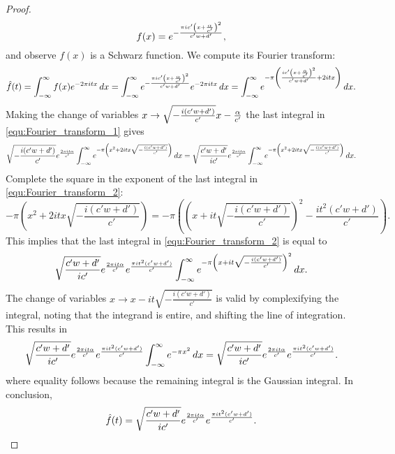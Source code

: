 \documentclass[12pt,reqno,oneside]{amsart}
\begin{document}
\begin{proof}
        \[
            f(x) = e^{-\frac{\pi ic'\left(x+\frac{\alpha}{c'}\right)^{2}}{c'w+d'}},
        \]
        and observe $f(x)$ is a Schwarz function. We compute its Fourier transform:
        \begin{equation}\label{equ:Fourier_transform_1}
            \hat{f}(t) = \int_{-\infty}^{\infty}f(x)e^{-2\pi itx}\,dx = \int_{-\infty}^{\infty}e^{-\frac{\pi ic'\left(x+\frac{\alpha}{c'}\right)^{2}}{c'w+d'}}e^{-2\pi itx}\,dx = \int_{-\infty}^{\infty}e^{-\pi\left(\frac{ic'\left(x+\frac{\alpha}{c'}\right)^{2}}{c'w+d'}+2itx\right)}\,dx.
        \end{equation}
        Making the change of variables $x \to \sqrt{-\frac{i(c'w+d')}{c'}}x-\frac{\alpha}{c'}$ the last integral in \cref{equ:Fourier_transform_1} gives
        \begin{equation}\label{equ:Fourier_transform_2}
            \sqrt{-\frac{i(c'w+d')}{c'}}e^{\frac{2\pi i t\alpha}{c'}}\int_{-\infty}^{\infty}e^{-\pi\left(x^{2}+2itx\sqrt{-\frac{i(c'w+d')}{c'}}\right)}\,dx = \sqrt{\frac{c'w+d'}{ic'}}e^{\frac{2\pi i t\alpha}{c'}}\int_{-\infty}^{\infty}e^{-\pi\left(x^{2}+2itx\sqrt{-\frac{i(c'w+d')}{c'}}\right)}\,dx.
        \end{equation}
        Complete the square in the exponent of the last integral in \cref{equ:Fourier_transform_2}:
        \[
            -\pi\left(x^{2}+2itx\sqrt{-\frac{i(c'w+d')}{c'}}\right) = -\pi\left(\left(x+it\sqrt{-\frac{i(c'w+d')}{c'}}\right)^{2}-\frac{it^{2}(c'w+d')}{c'}\right).
        \]
        This implies that the last integral in \cref{equ:Fourier_transform_2} is equal to
        \[
            \sqrt{\frac{c'w+d'}{ic'}}e^{\frac{2\pi i t\alpha}{c'}}e^{\frac{\pi it^{2}(c'w+d')}{c'}}\int_{-\infty}^{\infty}e^{-\pi\left(x+it\sqrt{-\frac{i(c'w+d')}{c'}}\right)^{2}}\,dx.
        \]
        The change of variables $x \to x-it\sqrt{-\frac{i(c'w+d')}{c'}}$ is valid by complexifying the integral, noting that the integrand is entire, and shifting the line of integration. This results in
        \[
            \sqrt{\frac{c'w+d'}{ic'}}e^{\frac{2\pi i t\alpha}{c'}}e^{\frac{\pi it^{2}(c'w+d')}{c'}}\int_{-\infty}^{\infty}e^{-\pi x^{2}}\,dx = \sqrt{\frac{c'w+d'}{ic'}}e^{\frac{2\pi i t\alpha}{c'}}e^{\frac{\pi it^{2}(c'w+d')}{c'}}.
        \]
        where equality follows because the remaining integral is the Gaussian integral. In conclusion,
        \begin{equation}\label{equ:Fourier_transform_result}
            \hat{f}(t) = \sqrt{\frac{c'w+d'}{ic'}}e^{\frac{2\pi i t\alpha}{c'}}e^{\frac{\pi it^{2}(c'w+d')}{c'}}.
        \end{equation}

\end{proof}
\end{document}
